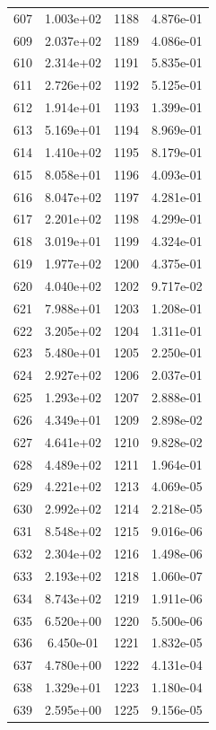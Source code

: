 \documentclass[12pt]{article}
\begin{document}
\begin{longtable}{@{}cccc@{}}
607 & 1.003e+02 & 1188 & 4.876e-01 \\
609 & 2.037e+02 & 1189 & 4.086e-01 \\
610 & 2.314e+02 & 1191 & 5.835e-01 \\
611 & 2.726e+02 & 1192 & 5.125e-01 \\
612 & 1.914e+01 & 1193 & 1.399e-01 \\
613 & 5.169e+01 & 1194 & 8.969e-01 \\
614 & 1.410e+02 & 1195 & 8.179e-01 \\
615 & 8.058e+01 & 1196 & 4.093e-01 \\
616 & 8.047e+02 & 1197 & 4.281e-01 \\
617 & 2.201e+02 & 1198 & 4.299e-01 \\
618 & 3.019e+01 & 1199 & 4.324e-01 \\
619 & 1.977e+02 & 1200 & 4.375e-01 \\
620 & 4.040e+02 & 1202 & 9.717e-02 \\
621 & 7.988e+01 & 1203 & 1.208e-01 \\
622 & 3.205e+02 & 1204 & 1.311e-01 \\
623 & 5.480e+01 & 1205 & 2.250e-01 \\
624 & 2.927e+02 & 1206 & 2.037e-01 \\
625 & 1.293e+02 & 1207 & 2.888e-01 \\
626 & 4.349e+01 & 1209 & 2.898e-02 \\
627 & 4.641e+02 & 1210 & 9.828e-02 \\
628 & 4.489e+02 & 1211 & 1.964e-01 \\
629 & 4.221e+02 & 1213 & 4.069e-05 \\
630 & 2.992e+02 & 1214 & 2.218e-05 \\
631 & 8.548e+02 & 1215 & 9.016e-06 \\
632 & 2.304e+02 & 1216 & 1.498e-06 \\
633 & 2.193e+02 & 1218 & 1.060e-07 \\
634 & 8.743e+02 & 1219 & 1.911e-06 \\
635 & 6.520e+00 & 1220 & 5.500e-06 \\
636 & 6.450e-01 & 1221 & 1.832e-05 \\
637 & 4.780e+00 & 1222 & 4.131e-04 \\
638 & 1.329e+01 & 1223 & 1.180e-04 \\
639 & 2.595e+00 & 1225 & 9.156e-05 \\

\bottomrule
\end{longtable}
\end{document}
